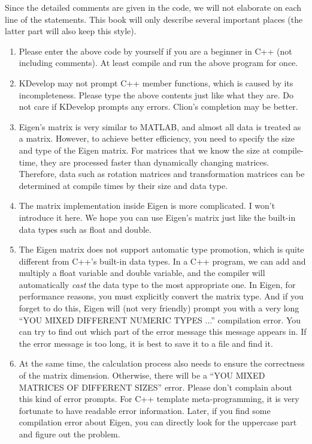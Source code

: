 Since the detailed comments are given in the code, we will not elaborate on each line of the statements. This book will only describe several important places (the latter part will also keep this style).

\begin{enumerate}
    \item Please enter the above code by yourself if you are a beginner in C++ (not including comments). At least compile and run the above program for once.
    
    \item KDevelop may not prompt C++ member functions, which is caused by its incompleteness. Please type the above contents just like what they are. Do not care if KDevelop prompts any errors. Clion's completion may be better. 
    
    \item Eigen's matrix is very similar to MATLAB, and almost all data is treated as a matrix. However, to achieve better efficiency, you need to specify the size and type of the Eigen matrix. For matrices that we know the size at compile-time, they are processed faster than dynamically changing matrices. Therefore, data such as rotation matrices and transformation matrices can be determined at compile times by their size and data type.
    
    \item The matrix implementation inside  Eigen is more complicated. I won't introduce it here. We hope you can use Eigen's matrix just like the built-in data types such as float and double. 
    
    \item The  Eigen matrix does not support automatic type promotion, which is quite different from C++'s built-in data types. In a C++ program, we can add and multiply a float variable and double variable, and the compiler will automatically \textit{cast} the data type to the most appropriate one. In Eigen, for performance reasons, you must explicitly convert the matrix type. And if you forget to do this, Eigen will (not very friendly) prompt you with a very long ``YOU MIXED DIFFERENT NUMERIC TYPES ...'' compilation error. You can try to find out which part of the error message this message appears in. If the error message is too long, it is best to save it to a file and find it.
    
    \item At the same time, the calculation process also needs to ensure the correctness of the matrix dimension. Otherwise, there will be a ``YOU MIXED MATRICES OF DIFFERENT SIZES'' error. Please don't complain about this kind of error prompts. For C++ template meta-programming, it is very fortunate to have readable error information. Later, if you find some compilation error about Eigen, you can directly look for the uppercase part and figure out the problem.
    

\end{enumerate}
